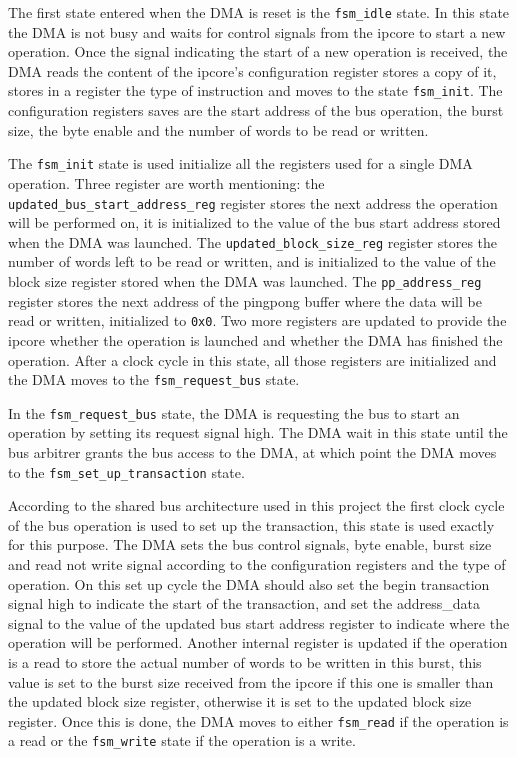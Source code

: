 \documentclass[a4paper,11pt,oneside]{report}
\begin{document}
The first state entered when the DMA is reset is the \texttt{fsm_idle} state. In this state the DMA is not busy and waits for control signals from the ipcore to start a new operation.
Once the signal indicating the start of a new operation is received, the DMA reads the content of the ipcore's configuration register stores a copy of it, stores in a register the type
of instruction and moves to the state \texttt{fsm_init}.
The configuration registers saves are the start address of the bus operation, the burst size, the byte enable and the number of words to be read or written.

The \texttt{fsm_init} state is used initialize all the registers used for a single DMA operation.
Three register are worth mentioning: the \texttt{updated\_bus\_start\_address\_reg} register stores the next address the operation will be performed on, it is initialized
to the value of the bus start address stored when the DMA was launched.
The \texttt{updated\_block\_size\_reg} register stores the number of words left to be read or written, and is initialized to the value of the block size register stored when the DMA was launched.
The \texttt{pp_address\_reg} register stores the next address of the pingpong buffer where the data will be read or written, initialized to \texttt{0x0}.
Two more registers are updated to provide the ipcore whether the operation is launched and whether the DMA has finished the operation.
After a clock cycle in this state, all those registers are initialized and the DMA moves to the \texttt{fsm\_request\_bus} state.

In the \texttt{fsm\_request\_bus} state, the DMA is requesting the bus to start an operation by setting its request signal high.
The DMA wait in this state until the bus arbitrer grants the bus access to the DMA, at which point the DMA moves to the \texttt{fsm\_set\_up\_transaction} state.

According to the shared bus architecture used in this project the first clock cycle of the bus operation is used to set up the transaction, this state is 
used exactly for this purpose.
The DMA sets the bus control signals, byte enable, burst size and read not write signal according to the configuration registers and the type of operation.
On this set up cycle the DMA should also set the begin transaction signal high to indicate the start of the transaction, and set the address\_data signal to 
the value of the updated bus start address register to indicate where the operation will be performed.
Another internal register is updated if the operation is a read to store the actual number of words to be written in this burst, this value is set to the burst size received 
from the ipcore if this one is smaller than the updated block size register, otherwise it is set to the updated block size register. 
Once this is done, the DMA moves to either \texttt{fsm\_read} if the operation is a read or the \texttt{fsm\_write} state if the operation is a write.
\end{document}
